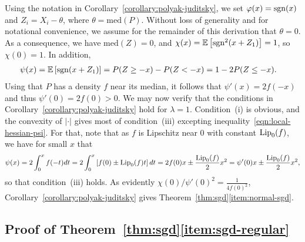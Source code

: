 Using the notation in Corollary~\ref{corollary:polyak-juditsky}, we set
$\varphi(x) = \mathrm{sgn}(x)$ and $Z_i = X_i - \theta$, where $\theta =
\mbox{med}(P)$. Without loss of generality and for notational convenience,
we assume for the remainder of this derivation that $\theta = 0$.
As a consequence, we have $\mbox{med}(Z) = 0$,
and $\chi(x) = \mathbb{E}\left[  \mathrm{sgn}^2(x+Z_1) \right]= 1$, so
$\chi(0) = 1$. In addition,
\begin{align*}
  \psi(x) & = \mathbb{E}\left[  \mathrm{sgn}(x+ Z_1) \right] =
  P(Z \ge -x) - P(Z < -x) = 1 - 2 P(Z \le -x).
\end{align*}
Using that $P$ has a density $f$ near its median, it follows that $\psi'(x)
= 2f(-x)$ and thus $\psi'(0) = 2f(0) > 0$.  We may now verify that the
conditions in Corollary~\ref{corollary:polyak-juditsky} hold for $\lambda =
1$. Condition~(i) is obvious, and the convexity of $|\cdot|$ gives most of
condition~(iii) excepting inequality~\eqref{eqn:local-hessian-psi}. For
that, note that as $f$ is Lipschitz near 0 with constant ${\rm \textup{Lip}}_0(f)$, we
have for small $x$ that
\begin{equation*}
  \psi(x) = 2 \int_0^x f(-t) dt
  = 2 \int_0^x \left[f(0) \pm {\rm \textup{Lip}}_0(f) t \right] dt
  = 2 f(0) x \pm \frac{{\rm \textup{Lip}}_0(f)}{2} x^2
  = \psi'(0) x \pm \frac{{\rm \textup{Lip}}_0(f)}{2} x^2,
\end{equation*}
so that condition~(iii) holds.
As evidently $\chi(0) / \psi'(0)^2 = \frac{1}{4 f(0)^2}$,
Corollary~\ref{corollary:polyak-juditsky} gives
Theorem~\ref{thm:sgd}\eqref{item:normal-sgd}.

\subsection{Proof of Theorem~\ref{thm:sgd}\eqref{item:sgd-regular}}
\label{sec:proof-sgd-regular}

